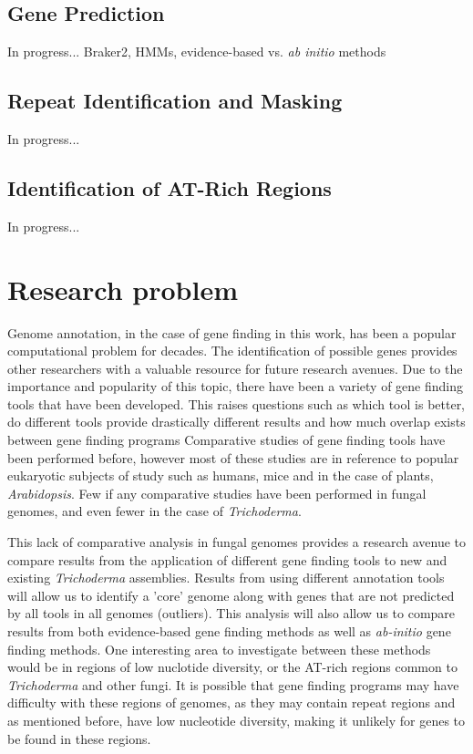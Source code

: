 \documentclass[12pt]{article}
\begin{document}
\subsection{Gene Prediction}
In progress... Braker2, HMMs, evidence-based vs. \textit{ab initio}
methods

\subsection{Repeat Identification and Masking}
In progress...

\subsection{Identification of AT-Rich Regions}
In progress...

\section{Research problem}

Genome annotation, in the case of gene finding in this work, has been
a popular computational problem for decades. The identification of
possible genes provides other researchers with a valuable resource for
future research avenues. Due to the importance and popularity of this
topic, there have been a variety of gene finding tools that have been
developed. This raises questions such as which tool is better, do
different tools provide drastically different results and how much
overlap exists between gene finding programs Comparative studies of
gene finding tools have been performed before, however most of these
studies are in reference to popular eukaryotic subjects of study such
as humans, mice and in the case of plants, \textit{Arabidopsis}. Few
if any comparative studies have been performed in fungal genomes, and
even fewer in the case of \textit{Trichoderma}.

This lack of comparative analysis in fungal genomes provides a
research avenue to compare results from the application of different
gene finding tools to new and existing \textit{Trichoderma}
assemblies. Results from using different annotation tools will allow
us to identify a 'core' genome along with genes that are not predicted
by all tools in all genomes (outliers). This analysis will also allow
us to compare results from both evidence-based gene finding methods as
well as \textit{ab-initio} gene finding methods. One interesting area
to investigate between these methods would be in regions of low
nuclotide diversity, or the AT-rich regions common to
\textit{Trichoderma} and other fungi. It is possible that gene finding
programs may have difficulty with these regions of genomes, as they
may contain repeat regions and as mentioned before, have low
nucleotide diversity, making it unlikely for genes to be found in
these regions.
\end{document}
